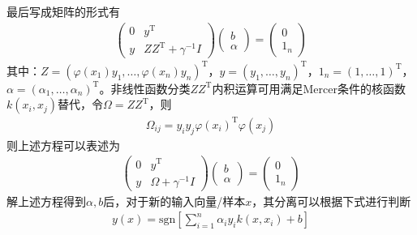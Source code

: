         最后写成矩阵的形式有
        \begin{align*}
        \begin{pmatrix}
        0 & y^\mathrm{T}\\
        y& ZZ^\mathrm{T}+\gamma^{-1}I
        \end{pmatrix}
        \begin{pmatrix}
        b\\
        \alpha
        \end{pmatrix}
        =\begin{pmatrix}
        0\\
        1_{n}
        \end{pmatrix}
        \end{align*}
        其中：$Z = (\varphi(x_1)y_1,\dots,\varphi(x_n)y_n )^\mathrm{T}$，$y = (y_1,\dots,y_n)^\mathrm{T}$，$1_n=(1,\dots,1)^\mathrm{T}$，$\alpha = (\alpha_1,\dots,\alpha_n)^\mathrm{T}$。非线性函数分类$ZZ^\mathrm{T}$内积运算可用满足Mercer条件的核函数$k(x_i,x_j)$替代，令$\Omega = ZZ^\mathrm{T}$，则
        \begin{align*}
        \Omega_{ij} = y_iy_j\varphi(x_i)^\mathrm{T}\varphi(x_j)
        \end{align*}
        则上述方程可以表述为
        \begin{align*}
        \begin{pmatrix}
        0 & y^\mathrm{T}\\
        y & \Omega+\gamma^{-1}I
        \end{pmatrix}
        \begin{pmatrix}
        b\\
        \alpha
        \end{pmatrix}
        =\begin{pmatrix}
        0\\
        1_{n}
        \end{pmatrix}
        \end{align*}
        解上述方程得到$\alpha,b$后，对于新的输入向量/样本$x$，其分离可以根据下式进行判断
        \begin{align*}
        y(x) = \mathrm{sgn} \left[ \sum_{i=1}^n\alpha_iy_i k(x,x_i) +b \right]
        \end{align*}
